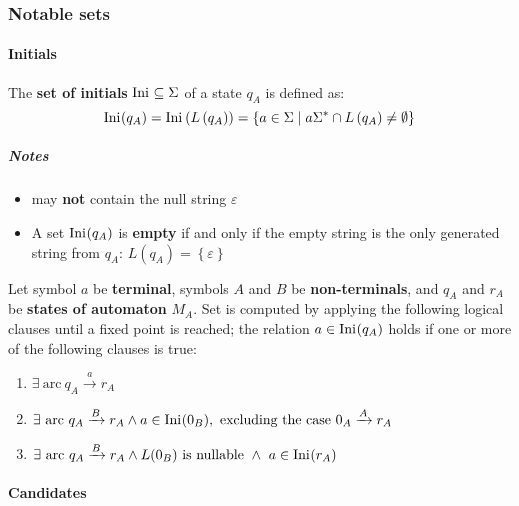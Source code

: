 \documentclass[english]{article}
\begin{document}
\subsubsection{Notable sets}

\paragraph{Initials}

\begin{definition}
  The \textbf{set of initials} \(\text{Ini}\hspace{0.1ex} \subseteq \Sigma\) of a state \(q_A\) is defined as:
  \[ \text{Ini}\hspace{0.1ex}(q_A) = \text{Ini}\hspace{0.1ex}\left( L\left( q_A \right) \right) = \left\{ a \in \Sigma \mid a \Sigma^\ast \cap L\left( q_A \right) \neq \emptyset \right\} \]
\end{definition}

\subparagraph*{Notes}

\begin{itemize}
  \item \Ini may \textbf{not} contain the null string \(\varepsilon\)
  \item A set \(\text{Ini}\hspace{0.1ex}(q_A)\) is \textbf{empty} if and only if the empty string is the only generated string from \(q_A\): \(L\left( q_A \right) = \left\{ \varepsilon \right\}\)
\end{itemize}

\bigskip
Let symbol \(a\) be \textbf{terminal}, symbols \(A\) and \(B\) be \textbf{non-terminals}, and \(q_A\) and \(r_A\) be \textbf{states of automaton} \(M_A\).
Set \Ini is computed by applying the following logical clauses until a fixed point is reached;
the relation \(a \in \text{Ini}\hspace{0.1ex}(q_A)\) holds if one or more of the following clauses is true:

\begin{enumerate}
  \item \(\exists \ \text{arc} \ q_A \xrightarrow{a} r_A\)
  \item \(\exists \ \text{arc} \ q_A \xrightarrow{B} r_A \land a \in \Ini(0_B), \ \text{excluding the case} \ 0_A \xrightarrow{A} r_A\)
  \item \(\exists \ \text{arc} \ q_A \xrightarrow{B} r_A \land L(0_B) \ \text{is nullable} \ \land \ a \in \text{Ini}\hspace{0.1ex}(r_A)\)
\end{enumerate}

\paragraph{Candidates}
\label{par:candidates}
\end{document}
